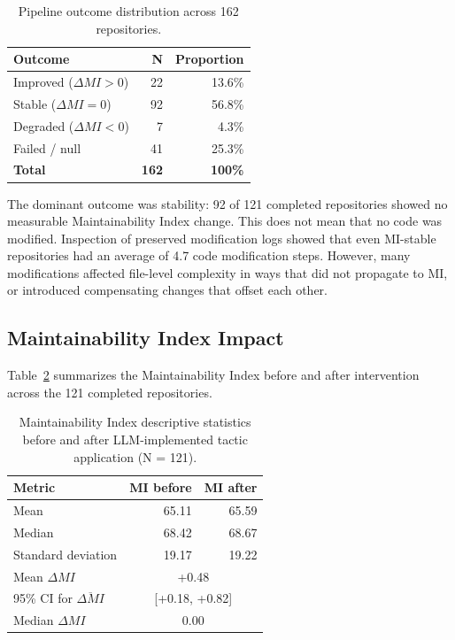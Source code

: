 \begin{table}[H]
\centering
\small
\caption{Pipeline outcome distribution across 162 repositories.}
\label{tab:eval_outcomes}
\begin{tabular}{lrr}
\toprule
\textbf{Outcome} & \textbf{N} & \textbf{Proportion} \\
\midrule
Improved ($\Delta MI > 0$) & 22 & 13.6\% \\
Stable ($\Delta MI = 0$) & 92 & 56.8\% \\
Degraded ($\Delta MI < 0$) & 7 & 4.3\% \\
Failed / null & 41 & 25.3\% \\
\midrule
\textbf{Total} & \textbf{162} & \textbf{100\%} \\
\bottomrule
\end{tabular}
\end{table}

The dominant outcome was stability: 92 of 121 completed repositories showed no measurable Maintainability Index change. This does not mean that no code was modified. Inspection of preserved modification logs showed that even MI-stable repositories had an average of 4.7 code modification steps. However, many modifications affected file-level complexity in ways that did not propagate to MI, or introduced compensating changes that offset each other.

\subsection{Maintainability Index Impact}
\label{subsec:eval_mi_impact}

Table~\ref{tab:eval_mi_descriptive} summarizes the Maintainability Index before and after intervention across the 121 completed repositories.

\begin{table}[H]
\centering
\small
\caption{Maintainability Index descriptive statistics before and after LLM-implemented tactic application (N = 121).}
\label{tab:eval_mi_descriptive}
\begin{tabular}{lrr}
\toprule
\textbf{Metric} & \textbf{MI before} & \textbf{MI after} \\
\midrule
Mean & 65.11 & 65.59 \\
Median & 68.42 & 68.67 \\
Standard deviation & 19.17 & 19.22 \\
\midrule
Mean $\Delta MI$ & \multicolumn{2}{c}{+0.48} \\
95\% CI for $\overline{\Delta MI}$ & \multicolumn{2}{c}{[+0.18, +0.82]} \\
Median $\Delta MI$ & \multicolumn{2}{c}{0.00} \\
\bottomrule
\end{tabular}
\end{table}

